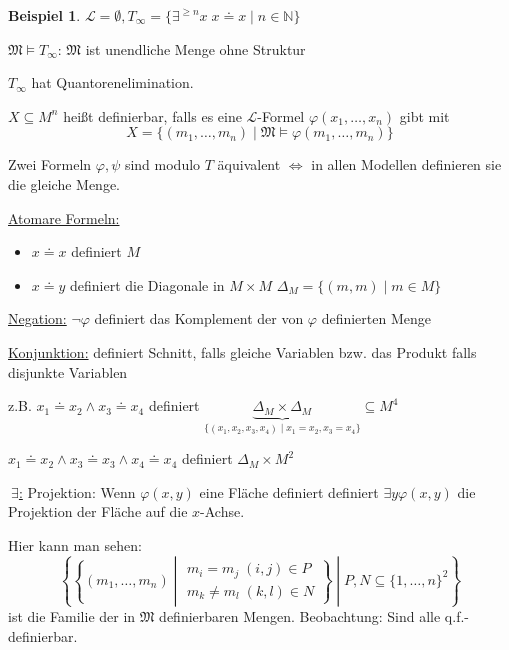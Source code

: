 \documentclass[12pt,parskip=full]{scrartcl}
\newcommand{\setN}{\mathbb{N}}
\newcommand{\Exists}{~\exists}
\newcommand{\heading}{\underline}
\theoremstyle{definition}
\newtheorem{example}[theorem]{Beispiel}
\begin{document}
	\begin{example}
		$\mathcal{L} = \emptyset, T_\infty = \{ \exists^{\geq n} x \; x \doteq x \mid n \in \setN \}$
		
		$\mathfrak{M} \models T_\infty$: $\mathfrak{M}$ ist unendliche Menge ohne Struktur
		
		$T_\infty$ hat Quantorenelimination.
		
		$X \subseteq M^n$ heißt definierbar, falls es eine $\mathcal{L}$-Formel $\varphi(x_1, \dots, x_n)$ gibt mit
		\begin{equation*}
			X = \{ (m_1, \dots, m_n) \mid \mathfrak{M} \models \varphi(m_1, \dots, m_n) \}
		\end{equation*}
		
		Zwei Formeln $\varphi, \psi$ sind modulo $T$ äquivalent $\Leftrightarrow$ in allen Modellen definieren sie die gleiche Menge.
		
		\heading{Atomare Formeln:}
		\begin{itemize}
			\item $x \doteq x$ definiert $M$
			\item $x \doteq y$ definiert die Diagonale in $M \times M$ $\Delta_M = \{ (m,m) \mid m \in M \}$
		\end{itemize}
	
		\heading{Negation:} $\lnot \varphi$ definiert das Komplement der von $\varphi$ definierten Menge
		
		\heading{Konjunktion:} definiert Schnitt, falls gleiche Variablen bzw. das Produkt falls disjunkte Variablen
		
		z.B. $x_1 \doteq x_2 \land x_3 \doteq x_4$ definiert $\underbrace{\Delta_M \times \Delta_M}_{\{ (x_1, x_2, x_3, x_4) \mid x_1 = x_2, x_3 = x_4 \}} \subseteq M^4$
		
		$x_1 \doteq x_2 \land x_3 \doteq x_3 \land x_4 \doteq x_4$ definiert $\Delta_M \times M^2$
		
		\heading{$\Exists$:} Projektion: Wenn $\varphi(x,y)$ eine Fläche definiert definiert $\exists y \varphi(x,y)$ die Projektion der Fläche auf die $x$-Achse.
		
		Hier kann man sehen:
		\begin{equation*}
			\left\{ \left\{ (m_1, \dots, m_n) \middle| \substack{m_i = m_j \; (i,j) \in P \\ m_k \neq m_l \; (k,l) \in N} \right\} \middle| P,N \subseteq \{1, \dots, n \}^2  \right\}
		\end{equation*}
		ist die Familie der in $\mathfrak{M}$ definierbaren Mengen. Beobachtung: Sind alle q.f.-definierbar.
	\end{example}
\end{document}
